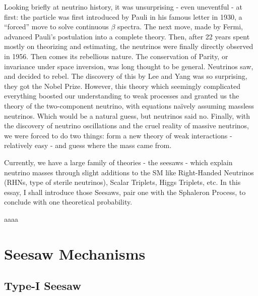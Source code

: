 \documentclass[a4paper,12pt]{article}
\begin{document}
Looking briefly at neutrino history, it was unsurprising - even uneventful - at first: the particle was first introduced by Pauli in his famous letter in 1930, a “forced” move to solve continuous $\beta$ %
spectra. The next move, made by Fermi, advanced Pauli’s postulation into a complete theory. Then, after 22 years spent mostly on theorizing and estimating, the neutrinos were finally directly observed in 1956. Then comes its rebellious nature. The conservation of Parity, or invariance under space inversion, was long thought to be general. Neutrinos saw, and decided to rebel. The discovery of this by Lee and Yang was so surprising, they got the Nobel Prize. However, this theory which seemingly complicated everything boosted our understanding to weak processes and granted us the theory of the two-component neutrino, with equations naïvely assuming massless neutrinos. Which would be a natural guess, but neutrinos said no. Finally, with the discovery of neutrino oscillations and the cruel reality of massive neutrinos, we were forced to do two things: form a new theory of weak interactions - relatively easy - and guess where the mass came from.

Currently, we have a large family of theories - the seesaws - which explain neutrino masses through slight additions to the SM like Right-Handed Neutrinos (RHNs, type of sterile neutrinos), Scalar Triplets, Higgs Triplets, etc. In this essay, I shall introduce those Seesaws, pair one with the Sphaleron Process, to conclude with one theoretical probability.


aaaa \cite{author2024title}



\section{Seesaw Mechanisms} \label{sec:seesaw} %

\subsection{Type-I Seesaw} %
\end{document}
